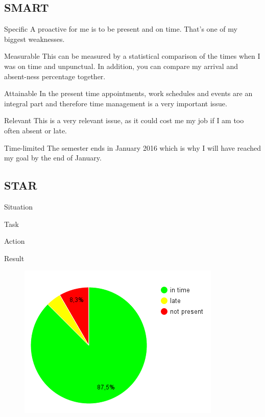 \documentclass[12pt]{article}
\begin{document}
		\subsection{SMART}
			\begin{SMART}
			    \item[Specific] A proactive for me is to be present and on time. That's one of my biggest weaknesses.
			    \item[Measurable] This can be measured by a statistical comparison of the times when I was on time and unpunctual. In addition, you can compare my arrival and absent-ness percentage together.
			    \item[Attainable] In the present time appointments, work schedules and events are an integral part and therefore time management is a very important issue.
			    \item[Relevant] This is a very relevant issue, as it could cost me my job if I am too often absent or late.
			    \item[Time-limited] The semester ends in January 2016 which is why I will have reached my goal by the end of January.
			\end{SMART}
		
		\subsection{STAR}
			\begin{STAR}
			    \item[Situation] 
			    \item[Task] 
			    \item[Action] 
			    \item[Result] 
			\end{STAR}
			
			\begin{figure}[htbp]
				\includegraphics[width=\textwidth]{../img/inTimeDiagramm}
			\end{figure}


%
\end{document}
